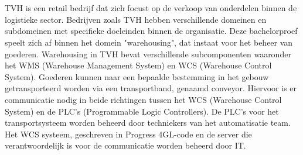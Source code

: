 
\chapter{}%
\label{ch:inleiding}



\section{}%
\label{sec:context}
TVH is een retail bedrijf dat zich focust op de verkoop van onderdelen binnen de logistieke sector. 
Bedrijven zoals TVH hebben verschillende domeinen en subdomeinen met specifieke doeleinden binnen de organisatie. 
Deze bachelorproef speelt zich af binnen het domein "warehousing", dat instaat voor het beheer van goederen.
Warehousing in TVH bevat verschillende subcomponenten waaronder het WMS (Warehouse Management System) en WCS (Warehouse Control System).
Goederen kunnen naar een bepaalde bestemming in het gebouw getransporteerd worden via een transportband, genaamd conveyor.
Hiervoor is er communicatie nodig in beide richtingen tussen het WCS (Warehouse Control System) en de PLC's (Programmable Logic Controllers).
De PLC's voor het transportsysteem worden beheerd door techniekers van het automatisatie team.
Het WCS systeem, geschreven in Progress 4GL-code en de server die verantwoordelijk is voor de communicatie worden beheerd door IT.
\newline
\newpage

